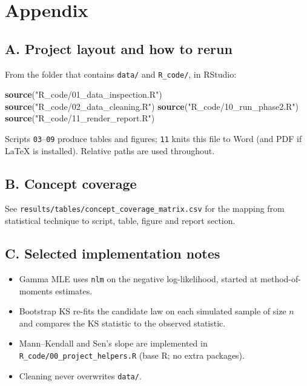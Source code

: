 \documentclass[
]{article}
\newenvironment{Shaded}{\begin{snugshade}}{\end{snugshade}}
\newcommand{\FunctionTok}[1]{\textcolor[rgb]{0.13,0.29,0.53}{\textbf{#1}}}
\newcommand{\NormalTok}[1]{#1}
\newcommand{\StringTok}[1]{\textcolor[rgb]{0.31,0.60,0.02}{#1}}
\providecommand{\tightlist}{%
  \setlength{\itemsep}{0pt}\setlength{\parskip}{0pt}}
\begin{document}
\section{Appendix}\label{appendix}

\subsection{A. Project layout and how to
rerun}\label{a.-project-layout-and-how-to-rerun}

From the folder that contains \texttt{data/} and \texttt{R\_code/}, in
RStudio:

\begin{Shaded}
\begin{Highlighting}[]
\FunctionTok{source}\NormalTok{(}\StringTok{"R\_code/01\_data\_inspection.R"}\NormalTok{)}
\FunctionTok{source}\NormalTok{(}\StringTok{"R\_code/02\_data\_cleaning.R"}\NormalTok{)}
\FunctionTok{source}\NormalTok{(}\StringTok{"R\_code/10\_run\_phase2.R"}\NormalTok{)}
\FunctionTok{source}\NormalTok{(}\StringTok{"R\_code/11\_render\_report.R"}\NormalTok{)}
\end{Highlighting}
\end{Shaded}

Scripts \texttt{03}--\texttt{09} produce tables and figures; \texttt{11}
knits this file to Word (and PDF if LaTeX is installed). Relative paths
are used throughout.

\subsection{B. Concept coverage}\label{b.-concept-coverage}

See \texttt{results/tables/concept\_coverage\_matrix.csv} for the
mapping from statistical technique to script, table, figure and report
section.

\subsection{C. Selected implementation
notes}\label{c.-selected-implementation-notes}

\begin{itemize}
\tightlist
\item
  Gamma MLE uses \texttt{nlm} on the negative log-likelihood, started at
  method-of-moments estimates.
\item
  Bootstrap KS re-fits the candidate law on each simulated sample of
  size \(n\) and compares the KS statistic to the observed statistic.
\item
  Mann--Kendall and Sen's slope are implemented in
  \texttt{R\_code/00\_project\_helpers.R} (base R; no extra packages).
\item
  Cleaning never overwrites \texttt{data/}.
\end{itemize}
\end{document}
